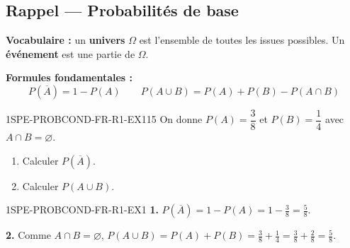 

\subsection*{Rappel --- Probabilités de base}

\textbf{Vocabulaire :} un \textbf{univers} $\Omega$ est l'ensemble de toutes les issues possibles. Un \textbf{événement} est une partie de $\Omega$.

\textbf{Formules fondamentales :}
\[
  P(\overline{A}) = 1 - P(A) \qquad P(A \cup B) = P(A) + P(B) - P(A \cap B)
\]

\begin{exercice}{1SPE-PROBCOND-FR-R1-EX1}{1}{5}
On donne $P(A) = \dfrac{3}{8}$ et $P(B) = \dfrac{1}{4}$ avec $A \cap B = \varnothing$.
\begin{enumerate}
  \item Calculer $P(\overline{A})$.
  \item Calculer $P(A \cup B)$.
\end{enumerate}
\end{exercice}


\begin{corrige}{1SPE-PROBCOND-FR-R1-EX1}
\textbf{1.} $P(\overline{A}) = 1 - P(A) = 1 - \frac{3}{8} = \frac{5}{8}$.

\textbf{2.} Comme $A \cap B = \varnothing$, $P(A \cup B) = P(A) + P(B) = \frac{3}{8} + \frac{1}{4} = \frac{3}{8} + \frac{2}{8} = \frac{5}{8}$.
\end{corrige}
